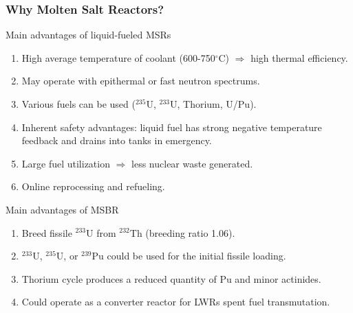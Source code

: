 \begin{frame}
  \frametitle{Why Molten Salt Reactors?}
                  \vspace*{-0.1in}
              \begin{block}{Main advantages of liquid-fueled \glspl{MSR}\cite{elsheikh_safety_2013}}
               \begin{enumerate}
                \item High average temperature of coolant (600-750$^{\circ}$C) $\Rightarrow$ high thermal efficiency.
                \item May operate with epithermal or fast neutron spectrums.
                \item Various fuels can be used ($^{235}$U, $^{233}$U, Thorium, U/Pu).
                \item Inherent safety advantages: liquid fuel has strong negative temperature feedback and drains into tanks in emergency.
                \item Large fuel utilization $\Rightarrow$ less nuclear waste generated.
                \item Online reprocessing and refueling.
               \end{enumerate}
               \end{block}
                  \vspace*{-0.1in}               
               \begin{block}{Main advantages of \gls{MSBR}\cite{robertson_conceptual_1971}}
               \begin{enumerate}
                \item Breed fissile $^{233}$U from $^{232}$Th (breeding ratio 1.06).
                \item $^{233}$U, $^{235}$U, or $^{239}$Pu could be used for the initial fissile loading.
                \item Thorium cycle produces a reduced quantity of Pu and minor actinides.
                \item Could operate as a converter reactor for \glspl{LWR} spent fuel transmutation.
               \end{enumerate}
               \end{block}

\end{frame}

